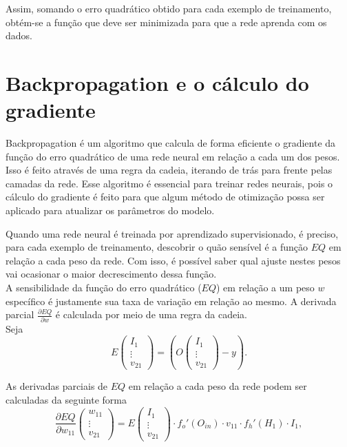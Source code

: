 \documentclass[a4paper,12pt]{article}
\begin{document}
Assim, somando o erro quadrático obtido para cada exemplo de treinamento, obtém-se a função que deve ser minimizada para que a rede aprenda com os dados.

\section{Backpropagation e o cálculo do gradiente}

Backpropagation é um algoritmo que calcula de forma eficiente o gradiente da função do erro quadrático de uma rede neural em relação a cada um dos pesos. Isso é feito através de uma regra da cadeia, iterando de trás para frente pelas camadas da rede. Esse algoritmo é essencial para treinar redes neurais, pois o cálculo do gradiente é feito para que algum método de otimização possa ser aplicado para atualizar os parâmetros do modelo.

Quando uma rede neural é treinada por aprendizado supervisionado, é preciso, para cada exemplo de treinamento, descobrir o quão sensível é a função $EQ$ em relação a cada peso da rede. Com isso, é possível saber qual ajuste nestes pesos vai ocasionar o maior decrescimento dessa função.\\

A sensibilidade da função do erro quadrático ($EQ$) em relação a um peso $w$ específico é justamente sua taxa de variação em relação ao mesmo. A derivada parcial $\frac{\partial EQ}{\partial w}$ é calculada por meio de uma regra da cadeia.\\

Seja
$$ E\begin{pmatrix}I_{1}\\\vdots\\v_{21}\end{pmatrix} = (O\begin{pmatrix}I_{1}\\ \vdots \\v_{21} \end{pmatrix} - y).
$$

As derivadas parciais de $EQ$ em relação a cada peso da rede podem ser calculadas da seguinte forma
$$
    \frac{\partial EQ}{\partial w_{11}}\begin{pmatrix}w_{11}\\\vdots\\v_{21}\end{pmatrix} = E\begin{pmatrix}I_{1}\\ \vdots \\v_{21} \end{pmatrix}\cdot f_o'(O_{in})\cdot v_{11} \cdot f_h'(H_{1})\cdot I_{1},
$$
\end{document}
